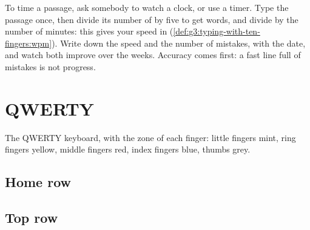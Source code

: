 To time a passage, ask somebody to watch a clock, or use a timer. Type the
passage once, then divide its number of  by five to get words, and
divide by the number of minutes: this gives your speed in 
(\cref{def:g3:typing-with-ten-fingers:wpm}). Write down the speed and the
number of mistakes, with the date, and watch both improve over the weeks.
Accuracy comes first: a fast line full of mistakes is not progress.

\section{QWERTY}

\begin{omfigure}

{\small The QWERTY keyboard, with the zone of each finger: little fingers
mint, ring fingers yellow, middle fingers red, index fingers blue, thumbs
grey.}
\label{fig:typ:typing-drills:us}
\end{omfigure}

\subsection*{Home row}


\subsection*{Top row}


